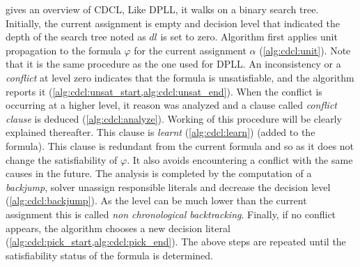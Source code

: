  gives an overview of CDCL, Like DPLL,  it walks on a binary search tree.
Initially, the current assignment is empty and decision level that 
indicated the depth of the search tree noted as $dl$ is set to zero.
Algorithm first applies unit propagation to the formula $\varphi$ for the current assignment $\alpha$ (\cref{alg:cdcl:unit}).
Note that it is  the same procedure as the one used for DPLL.
An inconsistency or a \emph{conflict} at level zero indicates that the formula is unsatisfiable, and the algorithm
reports it (\cref{alg:cdcl:unsat_start,alg:cdcl:unsat_end}). When the conflict is occurring at a higher level, it
reason was analyzed and a clause called \emph{conflict clause} is deduced (\cref{alg:cdcl:analyze}).
Working of this procedure will be clearly explained thereafter.
This clause is \emph{learnt} (\cref{alg:cdcl:learn}) (added to the formula). This clause is redundant from the current
formula and so as it does not change the satisfiability of $\varphi$. It also avoids encountering a conflict with the same
causes in the future.
The analysis is completed by the computation of a \emph{backjump}, solver unassign responsible literals and decrease the decision level (\cref{alg:cdcl:backjump}). As the level can be much lower than the current assignment this is called \emph{non chronological backtracking}.
Finally, if no conflict appears, the algorithm chooses a new decision literal 
(\cref{alg:cdcl:pick_start,alg:cdcl:pick_end}).
The above steps are repeated until the satisfiability status of the
formula is determined.



